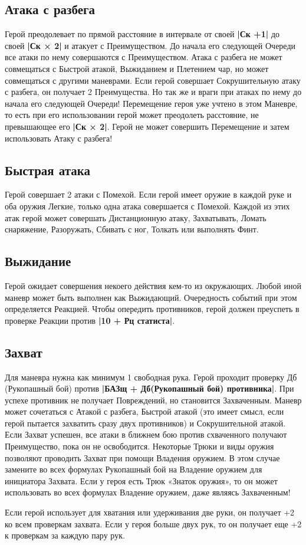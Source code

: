 \subsection{Атака с разбега}
Герой преодолевает по прямой расстояние в интервале от своей \textbf{|Ск +1|} до своей \textbf{|Ск × 2|} и атакует с Преимуществом. До начала его следующей Очереди все атаки по нему совершаются с Преимуществом. Атака с разбега не может совмещаться с Быстрой атакой, Выжиданием и Плетением чар, но может совмещаться с другими маневрами. Если герой совершает Сокрушительную атаку с разбега, он получает
2 Преимущества. Но так же и враги при атаках по нему до начала его следующей Очереди!
\newline
Перемещение героя уже учтено в этом Маневре, то есть при его использовании герой может преодолеть расстояние, не превышающее его \textbf{|Ск × 2|}. Герой не может совершить Перемещение и затем использовать Атаку с разбега!
\subsection{Быстрая атака}
Герой совершает 2 атаки с Помехой. Если герой имеет оружие в каждой руке и оба оружия Легкие, только одна атака совершается с Помехой. Каждой из этих атак герой может совершать Дистанционную атаку, Захватывать, Ломать снаряжение, Разоружать, Сбивать с ног, Толкать или выполнять Финт.
\subsection{Выжидание}
Герой ожидает совершения некоего действия кем-то из окружающих. Любой иной маневр может быть выполнен как Выжидающий.
\newline
Очередность событий при этом определяется Реакцией. Чтобы
опередить противников, герой должен преуспеть в проверке
Реакции против \textbf{|10 + Рц статиста|}.
\subsection{Захват}
Для маневра нужна как минимум 1 свободная рука. Герой проходит проверку Дб (Рукопашный бой) против \textbf{|БАЗщ + Дб(Рукопашный бой) противника|}. При успехе противник не получает Повреждений, но становится Захваченным. Маневр может сочетаться с Атакой с разбега, Быстрой атакой (это имеет смысл, если герой пытается захватить сразу двух
противников) и Сокрушительной атакой. Если Захват успешен, все атаки в ближнем бою против схваченного получают Преимущество, пока он не освободится. Некоторые Трюки и виды оружия позволяют проводить Захват при помощи Владения оружием. В этом случае замените во всех формулах Рукопашный бой на Владение оружием для инициатора Захвата. Если у героя есть Трюк «Знаток оружия», то он может использовать во всех формулах Владение оружием, даже являясь Захваченным!
\begin{tcolorbox}
Если герой использует для хватания или удерживания две руки, он получает +2 ко всем проверкам захвата. Если у героя больше двух рук, то он получает еще +2 к проверкам за каждую пару рук.
\end{tcolorbox}

